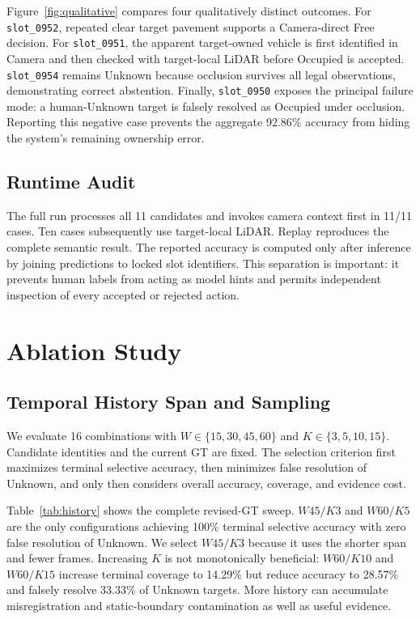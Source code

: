 \documentclass[conference]{IEEEtran}
\begin{document}
Figure~\ref{fig:qualitative} compares four qualitatively distinct outcomes. For \texttt{slot\_0952}, repeated clear target pavement supports a Camera-direct Free decision. For \texttt{slot\_0951}, the apparent target-owned vehicle is first identified in Camera and then checked with target-local LiDAR before Occupied is accepted. \texttt{slot\_0954} remains Unknown because occlusion survives all legal observations, demonstrating correct abstention. Finally, \texttt{slot\_0950} exposes the principal failure mode: a human-Unknown target is falsely resolved as Occupied under occlusion. Reporting this negative case prevents the aggregate 92.86\% accuracy from hiding the system's remaining ownership error.

\subsection{Runtime Audit}
The full run processes all 11 candidates and invokes camera context first in 11/11 cases. Ten cases subsequently use target-local LiDAR. Replay reproduces the complete semantic result. The reported accuracy is computed only after inference by joining predictions to locked slot identifiers. This separation is important: it prevents human labels from acting as model hints and permits independent inspection of every accepted or rejected action.

\section{Ablation Study}
\subsection{Temporal History Span and Sampling}
We evaluate 16 combinations with $W\in\{15,30,45,60\}$ and $K\in\{3,5,10,15\}$. Candidate identities and the current GT are fixed. The selection criterion first maximizes terminal selective accuracy, then minimizes false resolution of Unknown, and only then considers overall accuracy, coverage, and evidence cost.

Table~\ref{tab:history} shows the complete revised-GT sweep. $W45/K3$ and $W60/K5$ are the only configurations achieving 100\% terminal selective accuracy with zero false resolution of Unknown. We select $W45/K3$ because it uses the shorter span and fewer frames. Increasing $K$ is not monotonically beneficial: $W60/K10$ and $W60/K15$ increase terminal coverage to 14.29\% but reduce accuracy to 28.57\% and falsely resolve 33.33\% of Unknown targets. More history can accumulate misregistration and static-boundary contamination as well as useful evidence.
\end{document}
